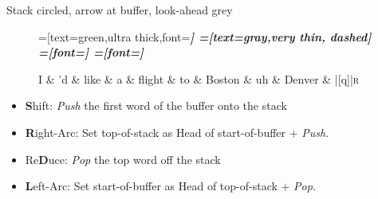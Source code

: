 \documentclass{lecture}
\begin{document}
\begin{plain}{Stack circled, arrow at buffer, look-ahead grey}
\begin{figure}
    \centering
    \begin{dependency}[theme=simple]
    =[text=green,ultra thick,font=\bfseries\itshape]
    =[text=gray,very thin, dashed]
    =[font=\bfseries\itshape]
    =[font=\itshape]
    \begin{deptext}[column sep=.075cm, row sep=.1ex]
        I \& 'd \& like \& a \& flight \& to \& Boston \& uh \& Denver \&  |[q]|\textsc{r} \\
    \end{deptext}
\end{dependency}
\end{figure}
    \begin{itemize}
        \item \textbf{S}hift: \emph{Push} the first word of the buffer onto the stack
    \item \textbf{R}ight-Arc: Set top-of-stack as Head of start-of-buffer + \emph{Push}.
    \item Re\textbf{D}uce: \emph{Pop} the top word off the stack
    \item \textbf{L}eft-Arc: Set start-of-buffer as Head of top-of-stack + \emph{Pop}.
    \end{itemize}
\end{plain}
\end{document}
